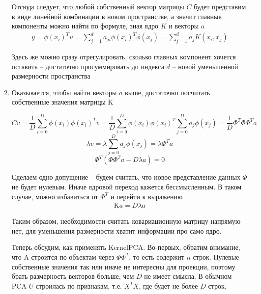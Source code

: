 \documentclass[12pt,fleqn]{article}
\begin{document}
\begin{enumerate}
Отсюда следует, что любой собственный вектор матрицы $C$ будет представим в виде линейной комбинации в новом пространстве, а значит главные компоненты можно найти по формуле, зная ядро $K$ и векторы $a$
\begin{equation}
  \begin{array}{l}
    y = \phi(x_i)^T u = \sum_{j=1}^d a_{ji} \phi(x_i)^T \phi(x_j) = \sum_{j=1}^d a_j K(x_i, x_j)
  \end{array}
\end{equation}

Здесь же можно сразу отрегулировать, сколько главных компонент хочется оставить -- достаточно просуммировать до индекса $d$ -- новой уменьшенной размерности пространства

\item Оказывается, чтобы найти векторы $a$ выше, достаточно посчитать собственные значения матрицы $\text{K}$

$$
Cv = \frac{1}{D}\sum_{i=0}^D \phi(x_i) \phi(x_i)^T v = \frac{1}{D}\sum_{i=0}^D \phi(x_i) \phi(x_i)^T \sum_{j=0}^D a_j \phi(x_j) = \frac{1}{D} \Phi^T\Phi\Phi^Ta
$$
$$
\lambda v = \lambda \sum_{j=0}^D a_j \phi(x_j) = \lambda \Phi^Ta
$$
$$
\Phi^T(\Phi\Phi^Ta - D\lambda a) = 0
$$

Сделаем одно допущение -- будем считать, что новое представление данных $\Phi$ не будет нулевым. Иначе ядровой переход кажется бессмысленным. В таком случае, можно избавиться от $\Phi^T$ и перейти к выражению
\begin{equation}
  \begin{array}{l}
    \text{K}a = D\lambda a
  \end{array}
\end{equation}

Таким образом, необходимости считать ковариационную матрицу напрямую нет, для уменьшения размерности хватит информации про само ядро.

Теперь обсудим, как применять KernelPCA. Во-первых, обратим внимание, что $\text{A}$ строится по объектам через $\Phi\Phi^T$, то есть содержит $n$ строк. Нулевые собственные значения так или иначе не интересны для проекции, поэтому брать размерность векторов больше, чем $D$ не имеет смысла. В обычном PCA $U$ строилась по признакам, т.е. $X^TX$, где будет не более $D$ строк. 


\end{enumerate}
\end{document}
